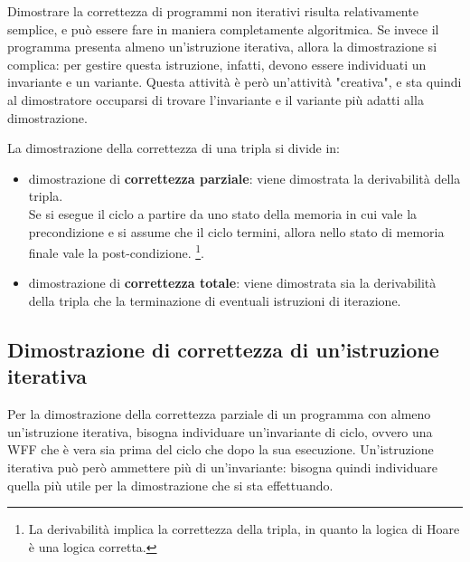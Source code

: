 Dimostrare la correttezza di programmi non iterativi risulta relativamente
semplice, e può essere fare in maniera completamente algoritmica.
Se invece il programma presenta almeno un'istruzione iterativa, allora
la dimostrazione si complica: per gestire questa istruzione, infatti,
devono essere individuati un invariante e un variante. Questa attività
è però un'attività "creativa", e sta quindi al dimostratore occuparsi di
trovare l'invariante e il variante più adatti alla dimostrazione.

La dimostrazione della correttezza di una tripla si divide in:
\begin{itemize}
    \item dimostrazione di \textbf{correttezza parziale}: viene dimostrata
    la derivabilità della tripla.\\
    Se si esegue il ciclo a partire da uno stato della memoria in cui vale
    la precondizione e si assume che il ciclo termini,
    allora nello stato di memoria finale vale la post-condizione.
    \footnote{La derivabilità implica la correttezza della tripla, in quanto
    la logica di Hoare è una logica corretta.}.
    \item dimostrazione di \textbf{correttezza totale}: viene dimostrata sia
    la derivabilità della tripla che la terminazione di eventuali istruzioni
    di iterazione.
\end{itemize}

\subsection*{Dimostrazione di correttezza di un'istruzione iterativa}
Per la dimostrazione della correttezza parziale di un programma
con almeno un'istruzione iterativa, bisogna individuare
un'invariante di ciclo, ovvero una WFF che è vera sia prima del ciclo
che dopo la sua esecuzione.
Un'istruzione iterativa può però ammettere più di un'invariante: bisogna
quindi individuare quella più utile per la dimostrazione che si sta effettuando.

